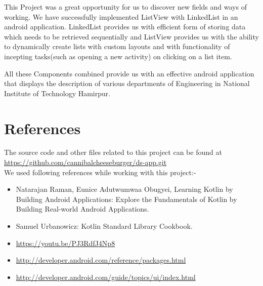 \documentclass[11pt,a4paper]{report}
\begin{document}
This Project was a great opportunity for us to discover new fields and ways of working.
We have successfully implemented ListView with LinkedList in an android application.
LinkedList provides us with efficient form of storing data which needs to be retrieved
sequentially and ListView provides us with the ability to dynamically create lists 
with  custom layouts and with functionality of incepting tasks(such as opening a new activity) on clicking on a list item.

All these Components combined provide us with an effective android application that displays
the description of various departments of Engineering in National Institute of Technology
Hamirpur.



\chapter{References}
\vskip 1cm
{\large{The source code and other files related to this project can  be found at}\\
\url{https://github.com/cannibalcheeseburger/ds-app.git}\\
\vskip 1cm
\large{We used following references while working with this project:-}
\begin{itemize}
	\item  Natarajan Raman, Eunice Adutwumwaa Obugyei, Learning Kotlin by Building Android Applications: Explore the Fundamentals of Kotlin by Building Real-world Android Applications.
	\item Samuel Urbanowicz: Kotlin Standard Library Cookbook.
	\item \url{https://youtu.be/PJ3RdfJ4Np8}
	\item \url{http://developer.android.com/reference/packages.html}
	\item \url{http://developer.android.com/guide/topics/ui/index.html}
\end{itemize}
}
\end{document}
